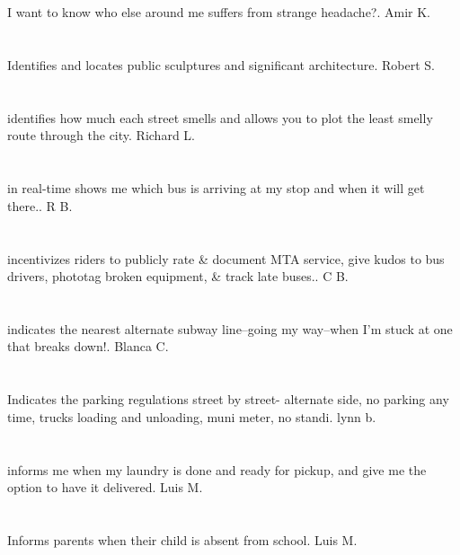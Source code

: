 \section{}I want to know who else around me suffers from strange headache?. Amir K.
\section{}Identifies and locates public sculptures and significant architecture. Robert S.
\section{}identifies how much each street smells and allows you to plot the least smelly route through the city. Richard L.
\section{}in real-time shows me which bus is arriving at my stop and when it will get there.. R B.
\section{}incentivizes riders to publicly rate \& document MTA service,  give kudos to bus drivers,  phototag broken equipment,  \& track late buses.. C B.
\section{}indicates the nearest alternate subway line--going my way--when I'm stuck at one that breaks down!. Blanca C.
\section{}Indicates the parking regulations street by street- alternate side,  no parking any time,  trucks loading and unloading,  muni meter,  no standi. lynn b.
\section{}informs me when my laundry is done and ready for pickup,  and give me the option to have it delivered. Luis M.
\section{}Informs parents when their child is absent from school. Luis M.
